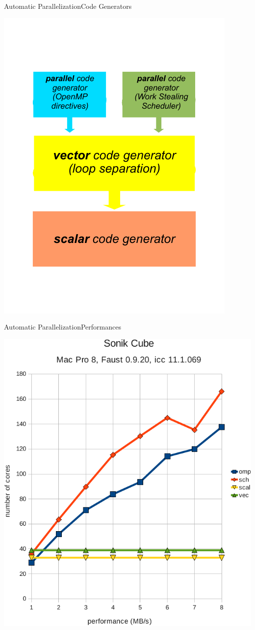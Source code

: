 \begin{frame}[fragile]{Automatic Parallelization}{Code Generators}
    \begin{center}
        \includegraphics[height=0.75\textheight]{images/compiler-stack1}
    \end{center}
\end{frame}


\begin{frame}[fragile]{Automatic Parallelization}{Performances}
    \begin{center}
        \includegraphics[height=0.75\textheight]{images/ethersonik-bench}
    \end{center}
\end{frame}
